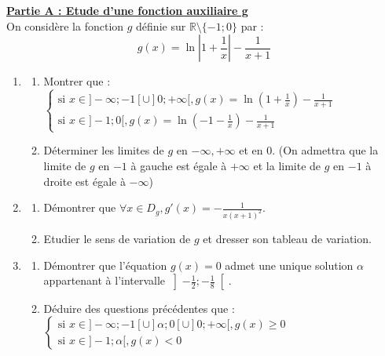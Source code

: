 \documentclass[12pt,a4paper]{article}
\begin{document}
\noindent \underline{\textbf{Partie A : Etude d'une fonction auxiliaire g}} \\
On considère la fonction $g$ définie sur $\mathbb{R} \setminus \{-1; 0\}$ par : 
\[ g(x) = \ln \left| 1 + \frac{1}{x} \right| - \frac{1}{x + 1} \]
\begin{enumerate}
    \item \begin{enumerate}
        \item Montrer que : 
        $\begin{cases} \text{si } x \in ]-\infty; -1[ \cup ]0; +\infty[, g(x) = \ln \left( 1 + \frac{1}{x} \right) - \frac{1}{x+1} \\ \text{si } x \in ]-1; 0[, g(x) = \ln \left( -1 - \frac{1}{x} \right) - \frac{1}{x+1} \end{cases}$
        \item Déterminer les limites de $g$ en $-\infty, +\infty$ et en 0. (On admettra que la limite de $g$ en $-1$ à gauche est égale à $+\infty$ et la limite de $g$ en $-1$ à droite est égale à $-\infty$)
    \end{enumerate}
    \item \begin{enumerate}
        \item Démontrer que $\forall x \in D_g, g'(x) = -\frac{1}{x(x+1)^2}$.
        \item Etudier le sens de variation de $g$ et dresser son tableau de variation.
    \end{enumerate}
    \item \begin{enumerate}
        \item Démontrer que l'équation $g(x) = 0$ admet une unique solution $\alpha$ appartenant à l'intervalle $\left]  -\frac{1}{2}; -\frac{1}{8}\right[   $.
        \item Déduire des questions précédentes que : 
        $\begin{cases} \text{si } x \in ]-\infty; -1[ \cup ]\alpha; 0[ \cup ]0; +\infty[, g(x) \ge 0 \\ \text{si } x \in ]-1; \alpha[, g(x) < 0 \end{cases}$
    \end{enumerate}
\end{enumerate}

\vspace{0.5cm}
\end{document}
